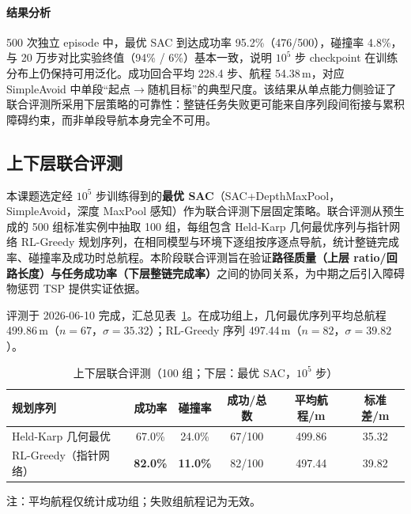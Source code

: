 \paragraph{结果分析}
500 次独立 episode 中，最优 SAC 到达成功率 95.2\%（476/500），碰撞率 4.8\%，与 20 万步对比实验终值（94\% / 6\%）基本一致，说明 $10^5$ 步 checkpoint 在训练分布上仍保持可用泛化。成功回合平均 228.4 步、航程 54.38\,m，对应 SimpleAvoid 中单段``起点$\to$随机目标''的典型尺度。该结果从单点能力侧验证了联合评测所采用下层策略的可靠性：整链任务失败更可能来自序列段间衔接与累积障碍约束，而非单段导航本身完全不可用。

\subsection{上下层联合评测}

本课题选定经 $10^5$ 步训练得到的\textbf{最优 SAC}（SAC+DepthMaxPool，SimpleAvoid，深度 MaxPool 感知）作为联合评测下层固定策略。联合评测从预生成的 500 组标准实例中抽取 100 组，每组包含 Held-Karp 几何最优序列与指针网络 RL-Greedy 规划序列，在相同模型与环境下逐组按序逐点导航，统计整链完成率、碰撞率及成功时总航程。本阶段联合评测旨在验证\textbf{路径质量（上层 ratio/回路长度）与任务成功率（下层整链完成率）}之间的协同关系，为中期之后引入障碍物惩罚 TSP 提供实证依据。

评测于 2026-06-10 完成，汇总见表~\ref{tab:joint-eval}。在成功组上，几何最优序列平均总航程 499.86\,m（$n=67$，$\sigma=35.32$）；RL-Greedy 序列 497.44\,m（$n=82$，$\sigma=39.82$）。

\begin{table}[htbp]
  \centering
  \caption{上下层联合评测（100 组；下层：最优 SAC，$10^5$ 步）}
  \label{tab:joint-eval}
  \begin{tabular}{lccccc}
    \toprule
    规划序列 & 成功率 & 碰撞率 & 成功/总数 & 平均航程/m & 标准差/m \\
    \midrule
    Held-Karp 几何最优 & 67.0\% & 24.0\% & 67/100 & 499.86 & 35.32 \\
    RL-Greedy（指针网络） & \textbf{82.0\%} & \textbf{11.0\%} & 82/100 & 497.44 & 39.82 \\
    \bottomrule
  \end{tabular}

  \small 注：平均航程仅统计成功组；失败组航程记为无效。
\end{table}

